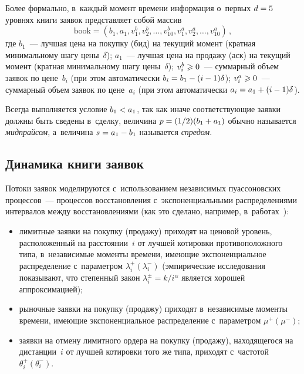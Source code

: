 \begin{multicols}{2}
Более формально, в~каждый момент времени информация о~первых $d \hm= 5$
уровнях книги заявок представляет собой массив
\begin{equation*}
\mathrm{book} = \left( b_1, a_1, v^b_1, v^b_2, \ldots, v^b_{10}, v^a_1, v^a_2,
\ldots, v^a_{10} \right)\,, %
\end{equation*}
где
$b_1$~--- лучшая цена на покупку (бид) на текущий момент
(кратная минимальному шагу цены~$\delta$);
$a_1$~--- лучшая цена на продажу (аск) на текущий момент
(кратная минимальному шагу цены~$\delta$);
$v^b_i \hm\geqslant 0$~--- суммарный объем заявок по цене~$b_i$ (при этом
автоматически $b_i \hm= b_1\hm - (i\hm - 1) \delta$);
$v^a_i \hm\geqslant 0$~--- суммарный объем заявок по цене~$a_i$ (при этом
автоматически $a_i \hm= a_1 \hm+ (i \hm- 1) \delta$).

Всегда выполняется условие $b_1 \hm< a_1$, так как иначе
соответствующие заявки должны быть сведены в~сделку, величина $p \hm=
(1/2)(b_1 \hm+ a_1)$ обычно называется {\it мидпрайсом}, а~величина
$s \hm= a_1 \hm- b_1$ называется {\it спредом}.

\subsection{Динамика книги заявок}

Потоки заявок моделируются с~использованием независимых
пуассоновских процессов~--- процессов восстановления
с~экспоненциальными распределе\-ниями интервалов между
восстановлениями (как это сделано, например,
в~работах~\cite{ContRamaStoikov2010b, ContLarrard2011}):
\begin{itemize}
\item лимитные заявки на покупку (продажу) приходят на ценовой уровень,
расположенный на\linebreak
 расстоянии~$i$ от лучшей котировки противоположного
типа, в~независимые моменты времени, имеющие экспоненциальное
распределение с~параметром $\lambda_i^{+} (\lambda_i^{-})$
(эмпирические исследова\-ния~\cite{Bouchaud2002, ZovkoFarmer2002} показывают, что степенный закон
$
\lambda_i^{\pm} = k/i^\alpha$
является хорошей аппроксимацией);
\item рыночные заявки на покупку (продажу) приходят в~независимые
моменты времени, име\-ющие экспоненциальное распределение с~параметром
$\mu^{+} (\mu^{-})$;
\item заявки на отмену лимитного ордера на покупку (продажу), находящегося
на дистанции~$i$ от лучшей котировки того же типа, приходят с~час\-то\-той $\theta_i^{+} (\theta_i^{-})$.
\end{itemize}


\end{multicols}
